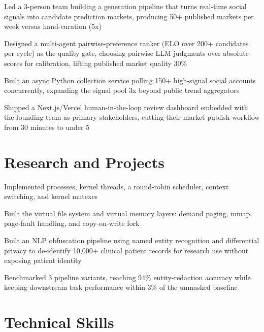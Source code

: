 \documentclass[10pt]{article}
\begin{document}
\begin{bullets}
  \item Led a 3-person team building a generation pipeline that turns real-time social signals into candidate prediction markets, producing 50+ published markets per week versus hand-curation (5x)
  \item Designed a multi-agent pairwise-preference ranker (ELO over 200+ candidates per cycle) as the quality gate, choosing pairwise LLM judgments over absolute scores for calibration, lifting published market quality 30\%
  \item Built an async Python collection service polling 150+ high-signal social accounts concurrently, expanding the signal pool 3x beyond public trend aggregators
  \item Shipped a Next.js/Vercel human-in-the-loop review dashboard embedded with the founding team as primary stakeholders, cutting their market publish workflow from 30 minutes to under 5
\end{bullets}

\section{Research and Projects}
\begin{bullets}
  \item Implemented processes, kernel threads, a round-robin scheduler, context switching, and kernel mutexes
  \item Built the virtual file system and virtual memory layers: demand paging, mmap, page-fault handling, and copy-on-write fork
\end{bullets}

\begin{bullets}
  \item Built an NLP obfuscation pipeline using named entity recognition and differential privacy to de-identify 10,000+ clinical patient records for research use without exposing patient identity
  \item Benchmarked 3 pipeline variants, reaching 94\% entity-redaction accuracy while keeping downstream task performance within 3\% of the unmasked baseline
\end{bullets}

\section{Technical Skills}
\end{document}
